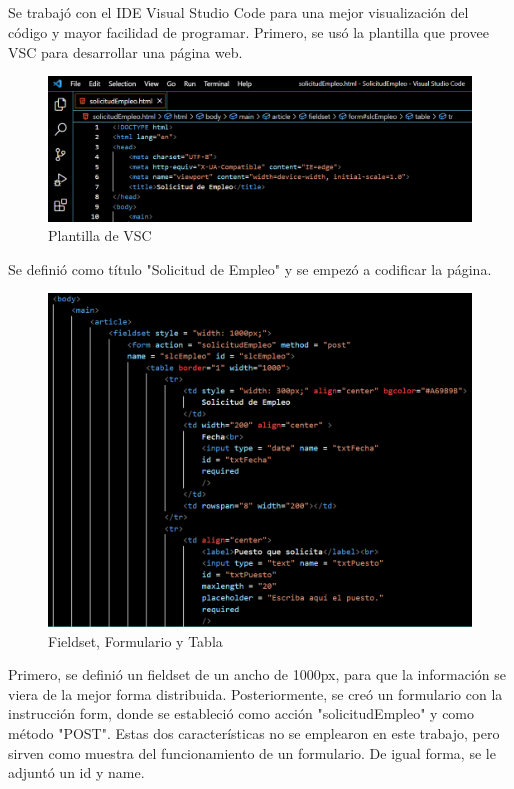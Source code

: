 \documentclass[10pt,a4paper]{article}
\begin{document}
\subsection{
	\textit{
		\color{colorESCOM}{Creación}
	}
}
Se trabajó con el IDE Visual Studio Code para una mejor visualización del código y mayor facilidad de programar.
Primero, se usó la plantilla que provee VSC para desarrollar una página web.

\begin{figure}[H]
	\includegraphics[scale=.54]{Capture}
	\centering
	\caption{Plantilla de VSC}
	\label{img:Capture}
\end{figure} 

Se definió como título "Solicitud de Empleo" y se empezó a codificar la página.

\begin{figure}[H]
	\includegraphics[scale=.54]{Capture2}
	\centering
	\caption{Fieldset, Formulario y Tabla}
	\label{img:Capture2}
\end{figure} 

Primero, se definió un fieldset de un ancho de 1000px, para que la información se viera de la mejor forma distribuida. Posteriormente, se creó un formulario con la instrucción form, donde se estableció como acción "solicitudEmpleo" y como método "POST". Estas dos características no se emplearon en este trabajo, pero sirven como muestra del funcionamiento de un formulario. De igual forma, se le adjuntó un id y name.
\end{document}
